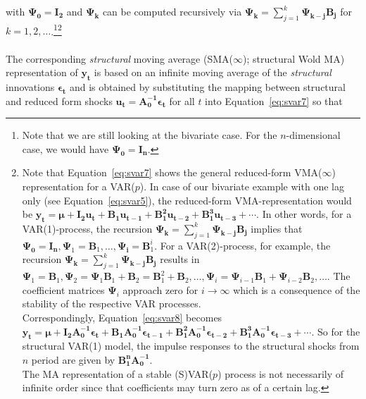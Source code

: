 \documentclass[a4paper,11pt,listof=nochaptergap,oneside,pointednumbers,bibtotoc,bigheadings,liststotoc]{scrbook}
\theoremstyle{mysatz}
\theoremstyle{mydefinition}
\theoremstyle{mybemerkung}
\newcommand{\vect}[1]{\boldsymbol{\mathbf{#1}}}
\begin{document}
with $\vect{\Psi_0} =\vect{\mathbf{I_2}}$ and $\vect{\Psi_k}$ can be computed recursively via $\vect{\Psi_k} = \sum\limits_{j=1}^k \vect{\Psi_{k-j}\vect{B_j}}$ for $k=1, 2, \dots$.\footnote{Note that we are still looking at the bivariate case. For the $n$-dimensional case, we would have $\vect{\Psi_0} =\vect{\mathbf{I_n}}$.}\footnote{Note that Equation~\ref{eq:svar7} shows the general reduced-form VMA($\infty$) representation for a VAR($p$). In case of our bivariate example with one lag only (see Equation~\ref{eq:svar5}), the reduced-form VMA-representation would be $\vect{y_t} = \vect{\mu} + \vect{I_2}\vect{u_t} + \vect{{B}_1}\vect{u_{t-1}} + \vect{{B}_1^2}\vect{u_{t-2}} + \vect{{B}_1^3}\vect{u_{t-3}} + \cdots$. In other words, for a VAR(1)-process, the recursion $\vect{\Psi_k} = \sum\limits_{j=1}^k \vect{\Psi_{k-j}\vect{B_j}}$ implies that $\vect{\Psi_0}=\vect{I_n}, \vect{\Psi}_1 = \vect{B}_1, \dots, \vect{\Psi_i} = {\vect{B}}_1^i$. For a VAR(2)-process, for example, the recursion $\vect{\Psi_k} = \sum\limits_{j=1}^k \vect{\Psi_{k-j}\vect{B_j}}$ results in $\vect{\Psi}_1 = \vect{B}_1, \vect{\Psi}_2 = \vect{\Psi}_1\vect{B}_1 + \vect{B}_2 = \vect{B}_1^2 + \vect{B}_2, \dots, \vect{\Psi}_i = \vect{\Psi}_{i-1}\vect{B}_1 + \vect{\Psi}_{i-2}\vect{B}_2, \dots$. The coefficient matrices $\vect{\Psi}_i$ approach zero for $i \to \infty$ which is a consequence of the stability of the respective VAR processes.\\
Correspondingly, Equation~\ref{eq:svar8} becomes $\vect{y_t} = \vect{\mu} + \vect{I_2}\vect{{A}_0^{-1}}\vect{\epsilon_t} + \vect{{B}_1}\vect{{A}_0^{-1}}\vect{\epsilon_{t-1}} + \vect{{B}_1^2}\vect{{A}_0^{-1}}\vect{\epsilon_{t-2}} + \vect{{B}_1^3}\vect{{A}_0^{-1}}\vect{\epsilon_{t-3}} + \cdots$. So for the structural VAR(1) model, the impulse responses to the structural shocks from $n$ period are given by $\vect{{B}_1^n}\vect{{A}_0^{-1}}$.\\
The MA representation of a stable (S)VAR($p$) process is not necessarily of infinite order since that coefficients may turn zero as of a certain lag.} \\
\\
The corresponding \textit{structural} moving average (SMA($\infty$); structural Wold MA) representation of $\vect{y_t}$ is based on an infinite moving average of the \textit{structural} innovations $\vect{\epsilon_t}$ and is obtained by substituting the mapping between structural and reduced form shocks $\vect{u_t} = \vect{A_0^{-1}}\vect{\epsilon_t}$ for all $t$ into Equation~\ref{eq:svar7} so that
\end{document}

